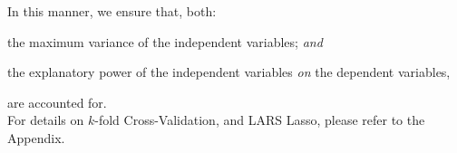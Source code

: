 \documentclass{ledger}
\begin{document}

In this manner, we ensure that, both:
\begin{compactenum}[$\bullet$]	
	\item the maximum variance of the independent variables; \textit{and}
	\item the explanatory power of the independent variables \textit{on} the dependent variables, 
\end{compactenum}
are accounted for. \\

For details on $k$-fold Cross-Validation, and LARS Lasso, please refer to the Appendix.
\end{document}
